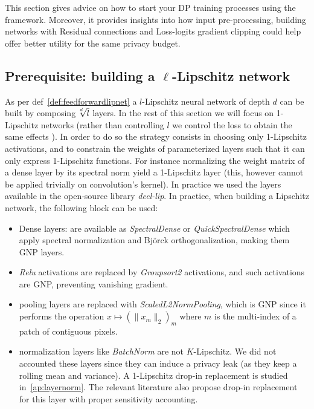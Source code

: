 
This section gives advice on how to start your DP training processes using the framework. Moreover, it provides insights into how input pre-processing, building networks with Residual connections and Loss-logits gradient clipping could help offer better utility for the same privacy budget. 

\subsection{Prerequisite: building a $\ell$-Lipschitz network}

    As per def~\ref{def:feedforwardlipnet} a $l$-Lipschitz neural network of depth $d$ can be built by composing $\sqrt[\leftroot{3} \uproot{2} d]{l}$ layers. In the rest of this section we will focus on 1-Lipschitz networks (rather than controlling $l$ we control the loss to obtain the same effects \cite{bethune2022pay}). In order to do so the strategy consists in choosing only 1-Lipschitz activations, and to constrain the weights of parameterized layers such that it can only express 1-Lipschitz functions. For instance normalizing the weight matrix of a dense layer by its spectral norm yield a 1-Lipschitz layer (this, however cannot be applied trivially on convolution's kernel). In practice we used the layers available in the open-source library \textit{deel-lip}. In practice, when building a Lipschitz network, the following block can be used:
    
    \begin{itemize}
        \item Dense layers: are available as \textit{SpectralDense} or \textit{QuickSpectralDense} which apply spectral normalization and Bj\"orck orthogonalization, making them GNP layers.
        \item \textit{Relu} activations are replaced by \textit{Groupsort2} activations, and such activations are GNP, preventing vanishing gradient.
        \item pooling layers are replaced with \textit{ScaledL2NormPooling}, which is GNP since it performs the operation $x\mapsto (\|x_m\|_2)_m$ where $m$ is the multi-index of a patch of contiguous pixels.
        \item normalization layers like \textit{BatchNorm} are not $K$-Lipschitz. We did not accounted these layers since they can induce a privacy leak (as they keep a rolling mean and variance). A 1-Lipschitz drop-in replacement is studied in~\ref{ap:layernorm}. The relevant literature also propose drop-in replacement for this layer with proper sensitivity accounting.
    \end{itemize}

